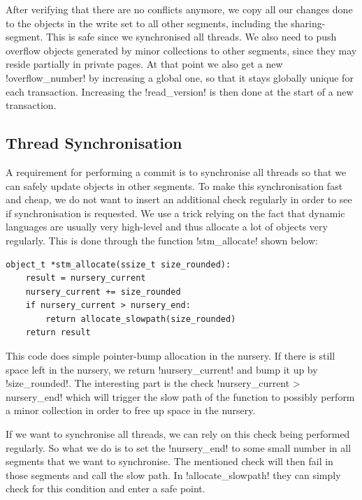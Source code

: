 \documentclass{sigplanconf}
\makeatletter
\renewcommand\lstinline[1][]{%
  \Collectverb{\@@myverb}%
}
\def\@@myverb#1{%
    \begingroup
    \fboxsep=0.2em
    \colorbox{verylightgray}{\oldlstinline|#1|}%
    \endgroup
}
\makeatother
\begin{document}
After verifying that there are no conflicts anymore, we copy all our
changes done to the objects in the write set to all other segments,
including the sharing-segment. This is safe since we synchronised all
threads. We also need to push overflow objects generated by minor
collections to other segments, since they may reside partially in
private pages. At that point we also get a new
\lstinline!overflow_number! by increasing a global one, so that it
stays globally unique for each transaction. Increasing the
\lstinline!read_version!  is then done at the start of a new
transaction.



\subsection{Thread Synchronisation}

A requirement for performing a commit is to synchronise all threads so
that we can safely update objects in other segments. To make this
synchronisation fast and cheap, we do not want to insert an additional
check regularly in order to see if synchronisation is requested. We
use a trick relying on the fact that dynamic languages are usually
very high-level and thus allocate a lot of objects very regularly.
This is done through the function \lstinline!stm_allocate!  shown
below:

\begin{lstlisting}
object_t *stm_allocate(ssize_t size_rounded):
    result = nursery_current
	nursery_current += size_rounded
	if nursery_current > nursery_end:
		return allocate_slowpath(size_rounded)
	return result
\end{lstlisting}


This code does simple pointer-bump allocation in the nursery. If there
is still space left in the nursery, we return
\lstinline!nursery_current!  and bump it up by
\lstinline!size_rounded!.  The interesting part is the check
\lstinline!nursery_current > nursery_end!  which will trigger the slow
path of the function to possibly perform a minor collection in order
to free up space in the nursery.

If we want to synchronise all threads, we can rely on this check being
performed regularly. So what we do is to set the
\lstinline!nursery_end!  to some small number in all segments that we
want to synchronise. The mentioned check will then fail in those
segments and call the slow path. In \lstinline!allocate_slowpath!
they can simply check for this condition and enter a safe point.
\end{document}
